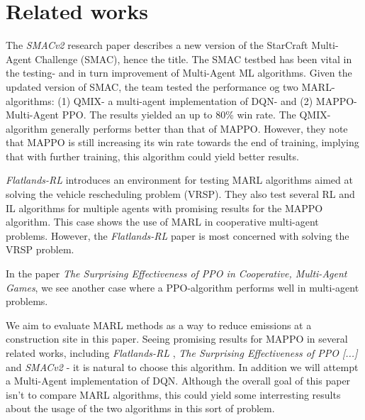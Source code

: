 \documentclass[conference]{IEEEtran}
\begin{document}
\noindent


\section{Related works}
The \textit{SMACv2} \cite{ellis2022smacv2} research paper describes a new version of the StarCraft Multi-Agent
Challenge (SMAC), hence the title. The SMAC testbed has been vital in the testing- and in turn improvement
of Multi-Agent ML algorithms. Given the updated version of SMAC, the team tested the performance og two
MARL- algorithms: (1) QMIX- a multi-agent implementation of DQN- and (2) MAPPO- Multi-Agent PPO. The
results yielded an up to 80\% win rate. The QMIX-algorithm generally performs better than that of MAPPO.
However, they note that MAPPO is still increasing its win rate towards the end of training, implying
that with further training, this algorithm could yield better results.

\textit{Flatlands-RL} \cite{laurent2021flatland} introduces an environment for testing MARL algorithms aimed at
solving the vehicle rescheduling problem (VRSP). They also test several RL and IL algorithms for
multiple agents with promising results for the MAPPO algorithm. This case shows the use of MARL in cooperative
multi-agent problems. However, the \textit{Flatlands-RL} paper is most concerned with solving the VRSP problem.

In the paper \textit{The Surprising Effectiveness of PPO in Cooperative, Multi-Agent Games}, \cite{yu2022surprising}
we see another case where a PPO-algorithm performs well in multi-agent problems.

We aim to evaluate MARL methods as a way to reduce \coo{} emissions at a construction site in this paper.
Seeing promising results for MAPPO in several related works, including \textit{Flatlands-RL} \cite{laurent2021flatland},
\textit{The Surprising Effectiveness of PPO [...]} \cite{yu2022surprising} and \textit{SMACv2} \cite{ellis2022smacv2}-
it is natural to choose this algorithm. In addition we will attempt a Multi-Agent implementation of DQN. Although the
overall goal of this paper isn't to compare MARL algorithms, this could yield some interresting results about the
usage of the two algorithms in this sort of problem.




\end{document}
